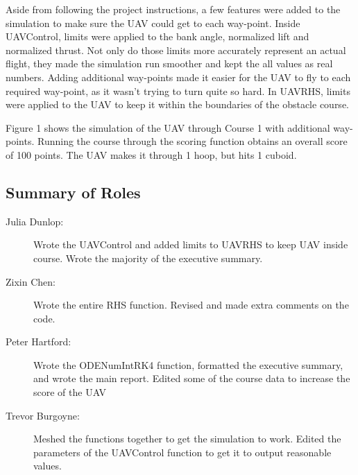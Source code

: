 \documentclass[12pt]{article}
\begin{document}
Aside from following the project instructions, a few features were added to the simulation to make sure the UAV could get to each way-point. Inside UAVControl, limits were applied to the bank angle, normalized lift and normalized thrust. Not only do those limits more accurately represent an actual flight, they made the simulation run smoother and kept the all values as real numbers. Adding additional way-points made it easier for the UAV to fly to each required way-point, as it wasn’t trying to turn quite so hard. In UAVRHS, limits were applied to the UAV to keep it within the boundaries of the obstacle course. 

Figure 1 shows the simulation of the UAV through Course 1 with additional way-points. Running the course through the scoring function obtains an overall score of 100 points. The UAV makes it through 1 hoop, but hits 1 cuboid. 	




\pagebreak
\subsection*{\centering Summary of Roles}  

\begin{description}
\item[Julia Dunlop:] Wrote the UAVControl and added limits to UAVRHS to keep UAV inside course. Wrote the majority of the executive summary. 

\item[Zixin Chen:] Wrote the entire RHS function. Revised and made extra comments on the code.

\item[Peter Hartford:] Wrote the ODENumIntRK4 function, formatted the executive summary, and wrote the main report. Edited some of the course data to increase the score of the UAV

\item[Trevor Burgoyne:] Meshed the functions together to get the simulation to work. Edited the parameters of the UAVControl function to get it to output reasonable values.

\end{description}

\pagebreak  
\end{document}
